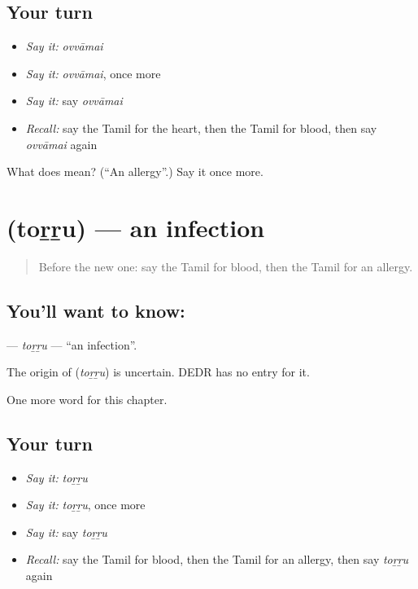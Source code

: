 \subsection*{Your turn}
\begin{itemize}
\raggedright
  \item \emph{Say it:} \emph{ovvāmai}
  \item \emph{Say it:} \emph{ovvāmai}, once more
  \item \emph{Say it:} say \emph{ovvāmai}
  \item \emph{Recall:} say the Tamil for the heart, then the Tamil for blood, then say \emph{ovvāmai} again
\end{itemize}

\begin{tcolorbox}[breakable,colback=teal!4,colframe=teal!35!black,title={Before you move on}]
What does  mean? (\textquotedblleft{}An allergy\textquotedblright{}.) Say it once more.
\end{tcolorbox}
\section[\texorpdfstring{\ta{தொற்று} (toṟṟu)}{தொற்று (toṟṟu)}]{ (toṟṟu) — an infection}

\label{lesson:TA-C170-torru}



\begin{quote}
Before the new one: say the Tamil for blood, then the Tamil for an allergy.
\end{quote}

\subsection*{You'll want to know: }
\textbf{} — \emph{toṟṟu} — \textquotedblleft{}an infection\textquotedblright{}.

\begin{cousinweb}
The origin of \textbf{} (\emph{toṟṟu}) is uncertain. DEDR has no entry for it.
\end{cousinweb}

\begin{grammarlens}[title={What you've built}]
One more word for this chapter.
\end{grammarlens}

\subsection*{Your turn}
\begin{itemize}
\raggedright
  \item \emph{Say it:} \emph{toṟṟu}
  \item \emph{Say it:} \emph{toṟṟu}, once more
  \item \emph{Say it:} say \emph{toṟṟu}
  \item \emph{Recall:} say the Tamil for blood, then the Tamil for an allergy, then say \emph{toṟṟu} again
\end{itemize}

